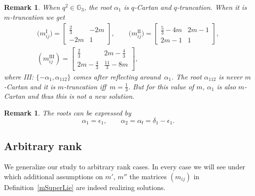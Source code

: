 \documentclass[10pt,a4paper]{amsart}
\numberwithin{equation}{section}
\newtheorem{oss}[teo]{Remark} }
\newcommand{\f}{\mathsf{f}}
\begin{document}
\begin{oss}\label{Heck5trunc}
When $q^2\in \mathbb{G}_3$, the root $\alpha_1$ is $q$-Cartan \textit{and} $q$-truncation.
When it is $m$-truncation we get
	\begin{gather*} \big(m_{ij}^{\mathrm{I}}\big)= \begin{bmatrix}
 \frac{2}{3} &-2m\\
 -2m & 1
\end{bmatrix}, \qquad
\big(m_{ij}^{\mathrm{II}}\big)= \begin{bmatrix}
 \frac{5}{3} -4m & 2m-1\\
 2m-1 & 1
\end{bmatrix}, \\
(m_{ij}^{\mathrm{III}})= \begin{bmatrix}
 \frac{2}{3} & 2m-\frac{4}{3}\\
 2m-\frac{4}{3} & \frac{11}{3}-8m
\end{bmatrix},
\end{gather*}
where III: $\lbrace -\alpha_{1}, \alpha_{112}\rbrace$ comes after reflecting around~$\alpha_1$.
The root $\alpha_{112}$ is never $m$-Cartan and it is $m$-truncation iff~$m=\frac{1}{3}$.
 But for this value of $m$, $\alpha_1$ is also $m$-Cartan and thus this is \emph{not} a new solution.
\end{oss}

\begin{oss} The roots can be expressed by \[ \alpha_1 =\epsilon_1, \qquad \alpha_2 = \alpha_\f = \delta_1 - \epsilon_1.\]
\end{oss}

\subsection{Arbitrary rank}\label{subsec_rankNsuper}
We generalize our study to arbitrary rank cases.
In every case we will see under which additional assumptions on $m'$, $m''$ the matrices $(m_{ij})$ in Definition~\ref{mSuperLie} are indeed realizing solutions.
\end{document}
